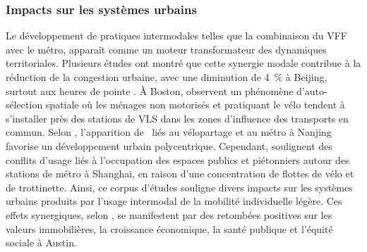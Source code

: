 \begin{refsegment}
\subsubsection*{Impacts sur les systèmes urbains
    \label{chap2:impacts-urbain}
    }

Le développement de pratiques intermodales telles que la combinaison du \acrshort{VFF} avec le métro, apparaît comme un moteur transformateur des dynamiques territoriales. Plusieurs études ont montré que cette synergie modale contribue à la réduction de la congestion urbaine, avec une diminution de 4~\% à Beijing, surtout aux heures de pointe \textcolor{blue}{\autocite[12]{fan_dockless_2020}}. À Boston, \textcolor{blue}{\textcite[13]{basu_planning_2021}} observent un phénomène d'auto-sélection spatiale où les ménages non motorisés et pratiquant le vélo tendent à s'installer près des stations de \acrshort{VLS} dans les zones d'influence des transports en commun. Selon \textcolor{blue}{\textcite[9-10]{yang_spatiotemporal_2019}}, l'apparition de ~liés au vélopartage et au métro à Nanjing favorise un développement urbain polycentrique. Cependant, \textcolor{blue}{\textcite[9]{yu_policy_2021}} soulignent des conflits d'usage liés à l'occupation des espaces publics et piétonniers autour des stations de métro à Shanghai, en raison d'une concentration de flottes de vélo et de trottinette. Ainsi, ce corpus d'études souligne divers impacts sur les systèmes urbains produits par l'usage intermodal de la mobilité individuelle légère. Ces effets synergiques, selon \textcolor{blue}{\textcite[3~495]{li_exploring_2017}}, se manifestent par des retombées positives sur les valeurs immobilières, la croissance économique, la santé publique et l'équité sociale à Austin.%


\end{refsegment}
